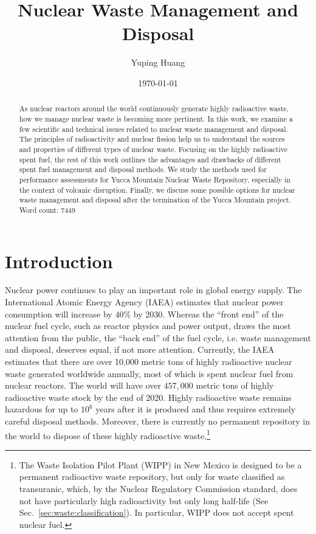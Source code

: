 \documentclass[nofootinbib,preprint,aps]{revtex4-1}
\begin{document}
\title{Nuclear Waste Management and Disposal}

\author{Yuping Huang}%

\date{\today}%
\begin{abstract}
    As nuclear reactors around the world continuously generate highly radioactive waste,
    how we manage nuclear waste is becoming more pertinent. In this work,
    we examine a few scientific and technical issues related to nuclear waste management and disposal.
    The principles of radioactivity and nuclear fission help us to understand the sources and properties
    of different types of nuclear waste. Focusing on the highly radioactive spent fuel, the rest
    of this work outlines the advantages and drawbacks of different spent fuel management and disposal
    methods. We study the methods used for performance assessments for Yucca Mountain Nuclear Waste Repository,
    especially in the context of volcanic disruption. Finally, we discuss some possible options for 
    nuclear waste management and disposal after
    the termination of the Yucca Mountain project.\\
    Word count: 7449\\
\end{abstract}
\maketitle
\tableofcontents
\newpage
\section{Introduction}
Nuclear power continues to play an important role in global energy supply.
The International Atomic Energy Agency (IAEA) estimates that nuclear power
consumption will increase by $40\%$ by 2030.\cite{iaea12}
Whereas the ``front end'' of the nuclear fuel cycle, such as reactor physics and power output, draws
the most attention from the public, the ``back end'' of the fuel cycle, i.e. waste management and
disposal, deserves equal, if not more attention.
Currently, the IAEA estimates that there are over 10,000 metric tons of highly radioactive nuclear waste 
generated worldwide annually,
most of which is spent nuclear fuel from nuclear reactors.\cite{iaea08, r12}
The world will have over $457,000$ metric tons of highly radioactive waste stock by the end of 2020.\cite{r12}
Highly radioactive waste remains hazardous for up to $10^6$ years after it is produced and thus
requires extremely careful disposal methods.
Moreover, there is currently no permanent repository in the world to dispose of these highly radioactive
waste.\footnote{The Waste Isolation Pilot Plant (WIPP) in New Mexico is designed to be a permanent radioactive
    waste repository, but only
for waste classified as transuranic, which, by the Nuclear Regulatory Commission standard, does not have particularly
high radioactivity but only long half-life (See Sec.~\ref{sec:waste:classification}). In particular, WIPP does not accept spent nuclear
fuel.}  
\end{document}
